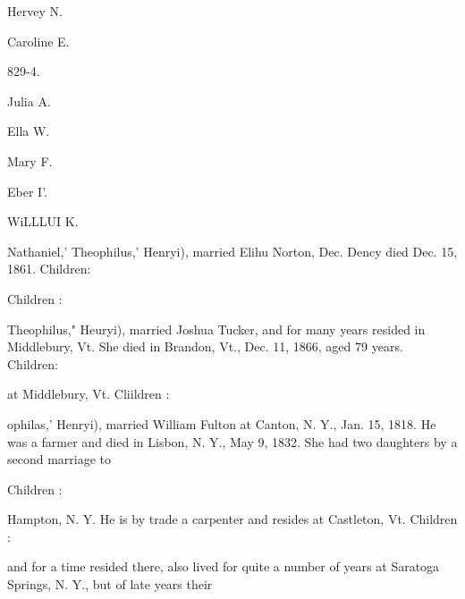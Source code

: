 \documentclass[oneside]{book}
\begin{document}
Hervey N. 




Caroline E. 


829-4. 


Julia A. 




Ella W. 




Mary F. 




Eber I'. 




WiLLLUI K. 



Nathaniel,' Theophilus,' Henryi), married Elihu Norton, Dec. 
Dency died Dec. 15, 1861. Children: 


















Children : 




Theophilus," Heuryi), married Joshua Tucker, and for many 
years resided in Middlebury, Vt. She died in Brandon, Vt., 
Dec. 11, 1866, aged 79 years. Children: 










at Middlebury, Vt. Cliildren : 







ophilas,' Henryi), married William Fulton at Canton, N. Y., 
Jan. 15, 1818. He was a farmer and died in Lisbon, N. Y., 
May 9, 1832. She had two daughters by a second marriage to 

Children : 











Hampton, N. Y. He is by trade a carpenter and resides at 
Castleton, Vt. Children : 





and for a time resided there, also lived for quite a number of 
years at Saratoga Springs, N. Y., but of late years their 
\end{document}

